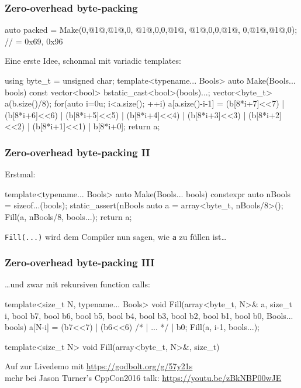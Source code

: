 \documentclass[t,ngerman,usepdftitle=false]{beamer}
\begin{document}
\begin{frame}[fragile]
  \frametitle{Zero-overhead byte-packing}
  \begin{cpplisting}
auto packed = Make(0,@1@,@1@,0,
                   @1@,0,0,@1@,	
                   @1@,0,0,@1@,
                   0,@1@,@1@,0); // = {0x69, 0x96}
  \end{cpplisting}

\pause
Eine erste Idee, schonmal mit variadic templates:
\begin{cpplisting}
using byte_t = unsigned char;
template<typename... Bools>
auto Make(Bools... bools) {
  const vector<bool> b{static_cast<bool>(bools)...};
  vector<byte_t> a(b.size()/8);
  for(auto i=0u; i<a.size(); ++i)
    a[a.size()-i-1] = (b[8*i+7]<<7) | (b[8*i+6]<<6) 
                    | (b[8*i+5]<<5) | (b[8*i+4]<<4) 
                    | (b[8*i+3]<<3) | (b[8*i+2]<<2) 
                    | (b[8*i+1]<<1) |  b[8*i+0];
  return a;
}
\end{cpplisting}
  
\end{frame}

\begin{frame}[fragile]
  \frametitle{Zero-overhead byte-packing II}
  
Erstmal: 
\begin{cpplisting}
template<typename... Bools>
auto Make(Bools... bools) {
  constexpr auto nBools = sizeof...(bools);
  static_assert(nBools %
  auto a = array<byte_t, nBools/8>();
  Fill(a, nBools/8, bools...);
  return a;
}
\end{cpplisting}

\lstinline|Fill(...)| wird dem Compiler nun sagen, wie \lstinline|a| zu füllen ist\ldots

\end{frame}

\begin{frame}[fragile]
  \frametitle{Zero-overhead byte-packing III}

\ldots{}und zwar mit rekursiven function calls:
\begin{cpplisting}
template<size_t N, typename... Bools>
void Fill(array<byte_t, N>& a,
          size_t i,
          bool b7, bool b6, bool b5, bool b4,
          bool b3, bool b2, bool b1, bool b0,
          Bools... bools) {
  a[N-i] = (b7<<7) | (b6<<6) /* | ... */ | b0;
  Fill(a, i-1, bools...);
}

template<size_t N>
void Fill(array<byte_t, N>&, size_t) {}
\end{cpplisting}

\pause
\begin{block}{}
  \centering Auf zur Livedemo mit \url{https://godbolt.org/g/57y21s}\\
  {\small mehr bei Jason Turner's CppCon2016 talk: \url{https://youtu.be/zBkNBP00wJE}}
\end{block}
    
\end{frame}
\end{document}
